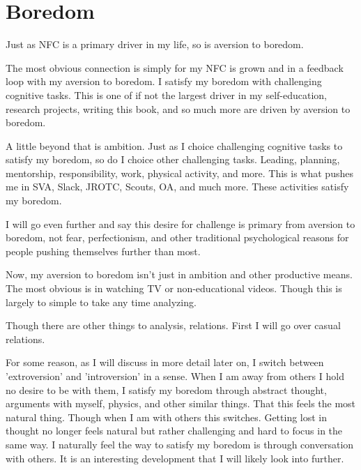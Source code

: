 \section{Boredom}
\par Just as NFC is a primary driver in my life, so is aversion to boredom. 
\par The most obvious connection is simply for my NFC is grown and in a feedback loop with my aversion to boredom. I satisfy my boredom with challenging cognitive tasks. This is one of if not the largest driver in my self-education, research projects, writing this book, and so much more are driven by aversion to boredom. 
\par A little beyond that is ambition. Just as I choice challenging cognitive tasks to satisfy my boredom, so do I choice other challenging tasks. Leading, planning, mentorship, responsibility, work, physical activity, and more. This is what pushes me in SVA, Slack, JROTC, Scouts, OA, and much more. These activities satisfy my boredom.
\par I will go even further and say this desire for challenge is primary from aversion to boredom, not fear, perfectionism, and other traditional psychological reasons for people pushing themselves further than most.
\par Now, my aversion to boredom isn't just in ambition and other productive means. The most obvious is in watching TV or non-educational videos. Though this is largely to simple to take any time analyzing.
\par Though there are other things to analysis, relations. First I will go over casual relations. 
\par For some reason, as I will discuss in more detail later on, I switch between 'extroversion' and 'introversion' in a sense. When I am away from others I hold no desire to be with them, I satisfy my boredom through abstract thought, arguments with myself, physics, and other similar things. That this feels the most natural thing. Though when I am with others this switches. Getting lost in thought no longer feels natural but rather challenging and hard to focus in the same way. I naturally feel the way to satisfy my boredom is through conversation with others. It is an interesting development that I will likely look into further.


